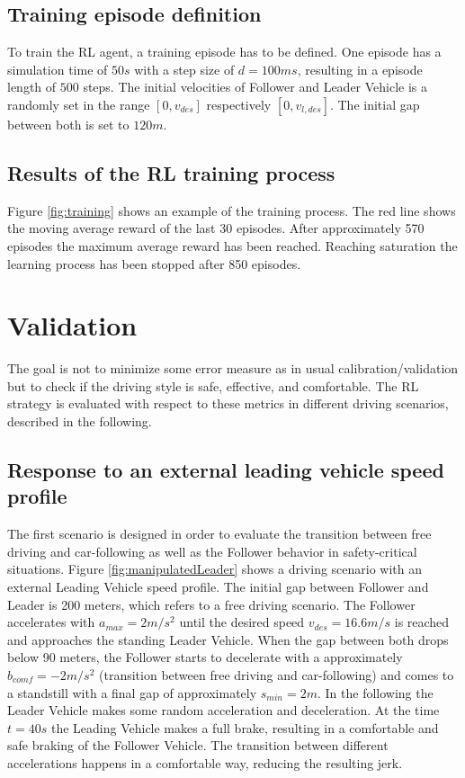 \documentclass[review]{elsarticle}
\begin{document}
\subsection{Training episode definition}

To train the RL agent, a training episode has to be defined. One episode has a simulation time of $50s$ with a step size of $d=100ms$, resulting in a episode length of $500$ steps. The initial velocities of Follower and Leader Vehicle is a randomly set in the range $[0,v_{des}]$ respectively  $[0,v_{l,des}]$. The initial gap between both is set to $120m$. 

\subsection{Results of the RL training process}

Figure \ref{fig:training} shows an example of the training process. The red line shows the moving average reward of the last 30 episodes. After approximately 570 episodes the maximum average reward has been reached. Reaching saturation the learning process has been stopped after 850 episodes. 

\section{Validation}

The goal is not to minimize some error measure as in usual
calibration/validation but to check if the driving style is safe,
effective, and comfortable. The RL strategy is evaluated with respect to these metrics in different driving scenarios, described in the following.

\subsection{Response to an external leading vehicle speed profile}
The first scenario is designed in order to evaluate the transition between free driving and car-following as well as the Follower behavior in safety-critical situations. 
Figure \ref{fig:manipulatedLeader} shows a driving scenario with an external Leading Vehicle speed profile. The initial gap between Follower and Leader is 200 meters, which refers to a free driving scenario. The Follower accelerates with $a_{max} = 2m/s^2$ until the desired speed $v_{des} = 16.6m/s$ is reached and approaches the standing Leader Vehicle. When the gap between both drops below 90 meters, the Follower starts to decelerate with a approximately $b_{comf} = -2m/s^2$ (transition between free driving and car-following) and comes to a standstill with a final gap of approximately $s_{min} = 2m$. In the following the Leader Vehicle makes some random acceleration and deceleration. At the time $t = 40s$ the Leading Vehicle makes a full brake, resulting in a comfortable and safe braking of the Follower Vehicle. The transition between different accelerations happens in a comfortable way, reducing the resulting jerk. 
\end{document}
